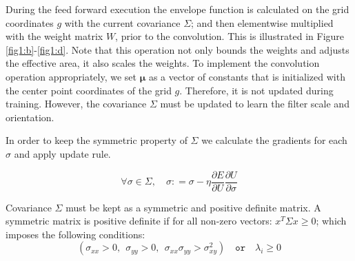 \documentclass{bmvc2k}
\begin{document}
During the feed forward execution the envelope function is calculated on the grid coordinates $g$ with the current covariance $\Sigma$; and then elementwise multiplied with the weight matrix $W$, prior to the convolution. This is illustrated in Figure \ref{fig1:b}-\ref{fig1:d}. Note that this operation not only bounds the weights and adjusts the effective area, it also scales the weights. To implement the convolution operation appropriately, we set $\boldsymbol{\mu}$ as a vector of constants that is initialized with the center point coordinates of the grid $g$. Therefore, it is not updated during training. However, the covariance $\Sigma$ must be updated to learn the filter scale and orientation.





In order to keep the symmetric property of $\Sigma$ we calculate the gradients for each $\sigma$ and apply update rule.


\begin{equation}
\label{eq:derivesigma}
\forall \sigma \in \Sigma, \quad \sigma \mathrel{{:}{=}} \sigma - \eta \frac{\partial E}{\partial U} \frac{\partial U}{\partial \sigma}
\end{equation}


Covariance $\Sigma$ must be kept as a symmetric and positive definite matrix.
A symmetric matrix is positive definite if for all non-zero vectors: $x^T \Sigma x\ge0$; which imposes the following conditions:
\begin{equation}
 \left( \sigma_{xx}>0, \: \: \sigma_{yy}>0, \: \: \sigma_{xx}\sigma_{yy}>\sigma^2_{xy}\right)  \quad
  \mathtt{or} \quad
 \lambda_i \ge 0
\end{equation}
\end{document}
